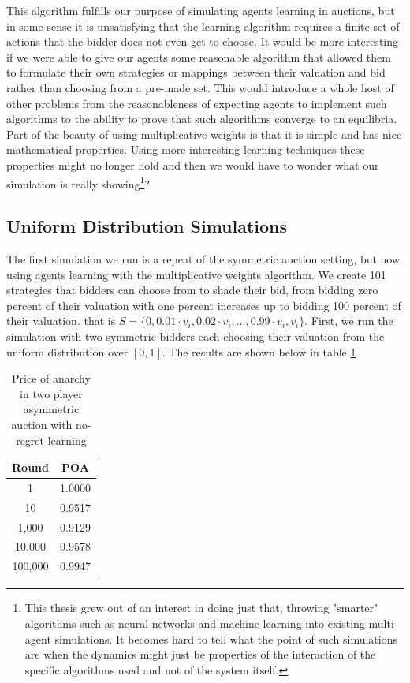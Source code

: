 \documentclass[12pt,twoside]{reedthesis}
\begin{document}
This algorithm fulfills our purpose of simulating agents learning in auctions, but in some sense it is unsatisfying that the learning algorithm requires a finite set of actions that the bidder does not even get to choose. It would be more interesting if we were able to give our agents some reasonable algorithm that allowed them to formulate their own strategies or mappings between their valuation and bid rather than choosing from a pre-made set. This would introduce a whole host of other problems from the reasonableness of expecting agents to implement such algorithms to the ability to prove that such algorithms converge to an equilibria. Part of the beauty of using multiplicative weights is that it is simple and has nice mathematical properties. Using more interesting learning techniques these properties might no longer hold and then we would have to wonder what our simulation is really showing\footnote{This thesis grew out of an interest in doing just that, throwing "smarter" algorithms such as neural networks and machine learning into existing multi-agent simulations. It becomes hard to tell what the point of such simulations are when the dynamics might just be properties of the interaction of the specific algorithms used and not of the system itself.}?

\subsection{Uniform Distribution Simulations}
The first simulation we run is a repeat of the symmetric auction setting, but now using agents learning with the multiplicative weights algorithm. We create 101 strategies that bidders can choose from to shade their bid, from bidding zero percent of their valuation with one percent increases up to bidding 100 percent of their valuation. that is $S = \{ 0, 0.01 \cdot v_i, 0.02 \cdot v_i, \ldots, 0.99 \cdot v_i, v_i \}$. First, we run the simulation with two symmetric bidders each choosing their valuation from the uniform distribution over $[0,1]$. The results are shown below in table \ref{table:3}

\begin{table}[h!]
	\begin{center}
		\begin{tabular}{ |c|c| }
			\hline
			Round & POA \\
			\hline
			1 & 1.0000 \\
			10 & 0.9517 \\
			1,000 & 0.9129 \\
			10,000 & 0.9578 \\
			100,000 & 0.9947 \\
			\hline
		\end{tabular}
		\caption{Price of anarchy in two player asymmetric auction with no-regret learning}
		\label{table:3}
	\end{center} 
\end{table}
\end{document}
